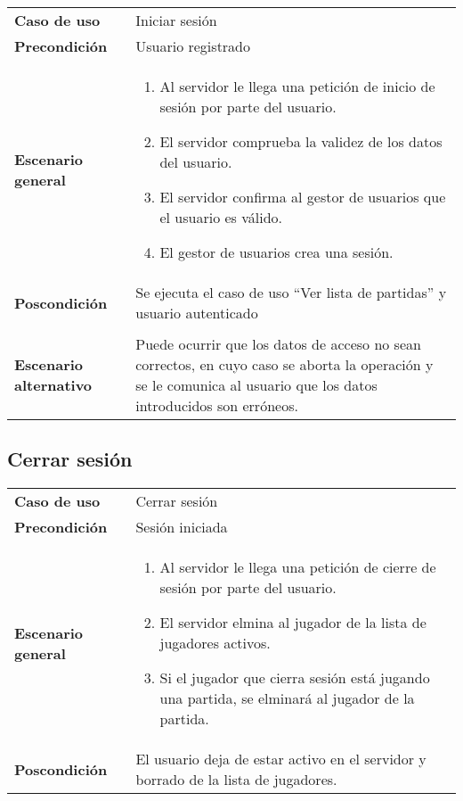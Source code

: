 {\footnotesize
\begin{tabularx}{0.95\textwidth}{p{}|X}

\textbf{Caso de uso} & Iniciar sesión \\

\textbf{Precondición} & Usuario registrado \\

\textbf{Escenario general} & \begin{enumerate}
\item Al servidor le llega una petición de inicio de sesión por parte del usuario.
\item El servidor comprueba la validez de los datos del usuario.
\item El servidor confirma al gestor de usuarios que el usuario es válido.
\item El gestor de usuarios crea una sesión.
\end{enumerate} \\

\textbf{Poscondición} & Se ejecuta el caso de uso ``Ver lista de partidas''
 y usuario autenticado\\ \\

\textbf{Escenario alternativo} & Puede ocurrir que los datos de acceso no sean
correctos, en cuyo caso se aborta la operación y se le comunica al usuario que los datos introducidos son erróneos.

\end{tabularx}
}

\subsection{Cerrar sesión}

{\footnotesize
\begin{tabularx}{0.95\textwidth}{p{}|X}

\textbf{Caso de uso} & Cerrar sesión \\

\textbf{Precondición} & Sesión iniciada \\

\textbf{Escenario general} & \begin{enumerate}
\item Al servidor le llega una petición de cierre de sesión por parte del usuario.
\item El servidor elmina al jugador de la lista de jugadores activos.
\item Si el jugador que cierra sesión está jugando una partida, se elminará al jugador de la partida.
\end{enumerate} \\

\textbf{Poscondición} & El usuario deja de estar activo en el servidor y borrado de la lista de jugadores.

\end{tabularx}
}

